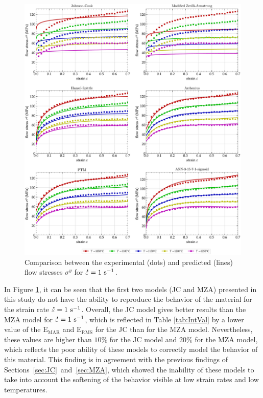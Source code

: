 \documentclass[metals,article,accept,pdftex,moreauthors]{Definitions/mdpi}
\DeclareRobustCommand{\mdot}[1]{\accentset{\mbox{\bfseries .}}{#1}}
\DeclareRobustCommand{\RMSE}{\text{E}_\text{RMS}}
\DeclareRobustCommand{\MARE}{\text{E}_\text{MAR}}
\DeclareRobustCommand{\ps}{\text{s}^{-1}}
\begin{document}
\begin{figure}[H]

\includegraphics[width=0.98\columnwidth]
{Figures/CompInt}
\caption{Comparison between the experimental (dots) and predicted (lines) flow stresses $\sigma^y$ for $\mdot\varepsilon=1~\ps$.}
\label{fig:CompInt}
\end{figure}

In Figure \ref{fig:CompInt}, it can be seen that the first two models (JC and MZA) presented in this study do not have the ability to reproduce the behavior of the material for the strain rate $\mdot\varepsilon=1~\ps$.
Overall, the JC model gives better results than the MZA model for $\mdot\varepsilon=1~\ps$, which is reflected in Table \ref{tab:IntVal} by a lower value of the $\MARE$ and $\RMSE$ for the JC than for the MZA model.
Nevertheless, these values are higher than $10\%$ for the JC model and $20\%$ for the MZA model, which reflects the poor ability of these models to correctly model the behavior of this material.
This finding is in agreement with the previous findings of \mbox{Sections \ref{sec:JC} and \ref{sec:MZA}}, which showed the inability of these models to take into account the softening of the behavior visible at low strain rates and low temperatures.
\end{document}
